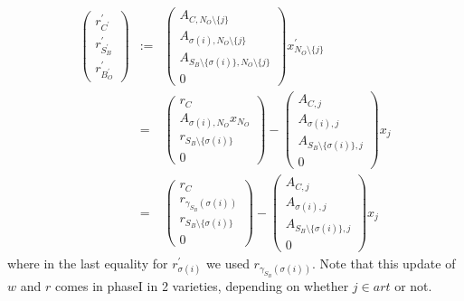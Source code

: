 \documentclass[a4paper]{article}
\begin{document}
\begin{eqnarray}
\left(
\begin{array}{c}
r_{C^{\prime}}^{\prime} \\
\hline
r_{S_{B}^{\prime}}^{\prime} \\
\hline
r_{B_{O}^{\prime}}^{\prime}
\end{array}
\right)
&:=&
\left(
\begin{array}{c}
A_{C, N_{O} \setminus \{j\}} \\
\hline
A_{\sigma(i), N_{O} \setminus \{j\}} \\
\hline
A_{S_{B} \setminus \{\sigma(i)\}, N_{O} \setminus \{j\}} \\
\hline
0
\end{array}
\right)
x_{N_{O} \setminus \{j\}}^{\prime}
\nonumber \\
&=&
\left(
\begin{array}{c}
r_{C} \\
\hline
A_{\sigma(i), N_{O}}x_{N_{O}} \\
\hline
r_{S_{B} \setminus \{\sigma(i)\}} \\
\hline
0
\end{array}
\right)
-
\left(
\begin{array}{c}
A_{C, j} \\
\hline
A_{\sigma(i), j} \\
\hline
A_{S_{B} \setminus \{\sigma(i)\}, j} \\
\hline
0
\end{array}
\right)
x_{j}
\nonumber \\
&=&
\left(
\begin{array}{c}
r_{C} \\
\hline
r_{\gamma_{S_{B}}(\sigma(i))} \\
\hline
r_{S_{B} \setminus \{\sigma(i)\}} \\
\hline
0
\end{array}
\right)
-
\left(
\begin{array}{c}
A_{C, j} \\
\hline
A_{\sigma(i), j} \\
\hline
A_{S_{B} \setminus \{\sigma(i)\}, j} \\
\hline
0
\end{array}
\right)
x_{j}
\end{eqnarray}
where in the last equality for $r_{\sigma(i)}^{\prime}$ we used
$r_{\gamma_{S_{B}}(\sigma(i))}$. Note that this update of $w$ and $r$ comes
in phaseI in 2 varieties, depending on whether $j \in art$ or not.
\end{document}
